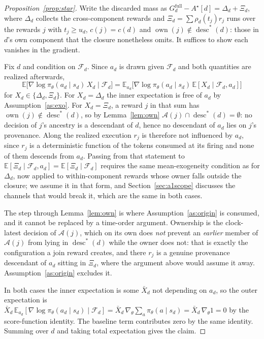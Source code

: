 \documentclass[review,authoryear,3p,times]{elsarticle}
\newcommand{\Fscr}{\mathcal{F}}
\newcommand{\Ascr}{\mathcal{A}}
\newcommand{\Ex}{\mathbb{E}}
\newcommand{\desc}{\operatorname{desc}}
\newcommand{\own}{\operatorname{own}}
\begin{document}
\begin{proof}[Proposition~\ref{prop:star}]
Write the discarded mass as
$G_d^{\mathrm{full}}-A^{\star}[d]=\Delta_d+\Xi_d$, where $\Delta_d$ collects the
cross-component rewards and
$\Xi_d=\sum \rho_d(t_j)r_j$ runs over the rewards $j$ with $t_j\ge u_d$,
$c(j)=c(d)$ and $\own(j)\notin\desc^{*}(d)$: those in $d$'s own component that
the closure nonetheless omits. It suffices to show each vanishes in the
gradient.

Fix $d$ and condition on $\Fscr_d$. Since $a_d$ is drawn given $\Fscr_d$ and
both quantities are realized afterwards,
\[
  \Ex\bigl[\nabla\log\pi_\theta(a_d\mid s_d)\,X_d \mid \Fscr_d\bigr]
  = \Ex_{a_d}\bigl[\nabla\log\pi_\theta(a_d\mid s_d)\,
    \Ex[X_d\mid\Fscr_d,a_d]\bigr]
\]
for $X_d\in\{\Delta_d,\Xi_d\}$. For $X_d=\Delta_d$ the inner expectation is
free of $a_d$ by Assumption~\ref{as:exo}. For $X_d=\Xi_d$, a reward $j$ in that
sum has $\own(j)\notin\desc^{*}(d)$, so by Lemma~\ref{lem:own}
$\Ascr(j)\cap\desc^{*}(d)=\emptyset$: no decision of $j$'s ancestry is a
descendant of $d$, hence no descendant of $a_d$ lies on $j$'s provenance. Along
the realized execution $r_j$ is therefore not influenced by $a_d$, since $r_j$
is a deterministic function of the tokens consumed at its firing and none of
them descends from $a_d$. Passing from that statement to
$\Ex[\Xi_d\mid\Fscr_d,a_d]=\Ex[\Xi_d\mid\Fscr_d]$ requires the same
mean-exogeneity condition as for $\Delta_d$, now applied to within-component
rewards whose owner falls outside the closure; we assume it in that form, and
Section~\ref{sec:a1scope} discusses the channels that would break it, which are
the same in both cases.

The step through Lemma~\ref{lem:own} is where Assumption~\ref{as:origin} is
consumed, and it cannot be replaced by a time-order argument. Ownership is the
clock-latest decision of $\Ascr(j)$, which on its own does \emph{not} prevent an
\emph{earlier} member of $\Ascr(j)$ from lying in $\desc^{*}(d)$ while the owner
does not: that is exactly the configuration a join reward creates, and there
$r_j$ is a genuine provenance descendant of $a_d$ sitting in $\Xi_d$, where the
argument above would assume it away. Assumption~\ref{as:origin} excludes it.

In both cases the inner expectation is some $\bar X_d$ not depending on $a_d$,
so the outer expectation is
$\bar X_d\,\Ex_{a_d}[\nabla\log\pi_\theta(a_d\mid s_d)\mid\Fscr_d]
 =\bar X_d\,\nabla_\theta\sum_a \pi_\theta(a\mid s_d)=\bar X_d\,\nabla_\theta 1=0$
by the score-function identity. The baseline term contributes zero by the same
identity. Summing over $d$ and taking total expectation gives the claim.
\end{proof}
\end{document}
